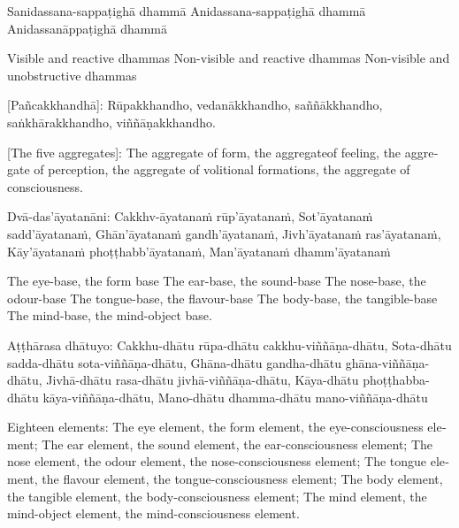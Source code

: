 Sanidassana-sappaṭighā dhammā
Anidassana-sappaṭighā dhammā
Anidassanāppaṭighā dhammā

\begin{english}
  Visible and reactive dhammas
  Non-visible and reactive dhammas
  Non-visible and unobstructive dhammas
\end{english}

\suttaRef{[Dhs 1]}

[Pañcakkhandhā]:
Rūpakkhandho, vedanākkhandho,
saññākkhandho, saṅkhārakkhandho,
viññāṇakkhandho.

\begin{english}
  [The five aggregates]: The aggregate of form, the aggregateof feeling, the aggregate of perception, the aggregate of volitional formations, the aggregate of consciousness.
\end{english}

\suttaRef{[MN 109]}

Dvā-das’āyatanāni:
Cakkhv-āyatanaṁ rūp’āyatanaṁ,
Sot’āyatanaṁ sadd’āyatanaṁ,
Ghān’āyatanaṁ gandh’āyatanaṁ,
Jivh’āyatanaṁ ras’āyatanaṁ,
Kāy’āyatanaṁ phoṭṭhabb’āyatanaṁ,
Man’āyatanaṁ dhamm’āyatanaṁ

\begin{english}
  The eye-base, the form base
  The ear-base, the sound-base
  The nose-base, the odour-base
  The tongue-base, the flavour-base
  The body-base, the tangible-base
  The mind-base, the mind-object base.
\end{english}

\suttaRef{[MN 148]}

Aṭṭhārasa dhātuyo:
Cakkhu-dhātu rūpa-dhātu cakkhu-viññāṇa-dhātu,
Sota-dhātu sadda-dhātu sota-viññāṇa-dhātu,
Ghāna-dhātu gandha-dhātu ghāna-viññāṇa-dhātu,
Jivhā-dhātu rasa-dhātu jivhā-viññāṇa-dhātu,
Kāya-dhātu phoṭṭhabba-dhātu kāya-viññāṇa-dhātu,
Mano-dhātu dhamma-dhātu mano-viññāṇa-dhātu

\begin{english}
  Eighteen elements: The eye element, the form element, the eye-consciousness
  element;
  The ear element, the sound element, the ear-consciousness element;
  The nose element, the odour element, the nose-consciousness element;
  The tongue element, the flavour element, the tongue-consciousness element;
  The body element, the tangible element, the body-consciousness element;
  The mind element, the mind-object element, the mind-consciousness element.
\end{english}

\suttaRef{[MN 115]}

